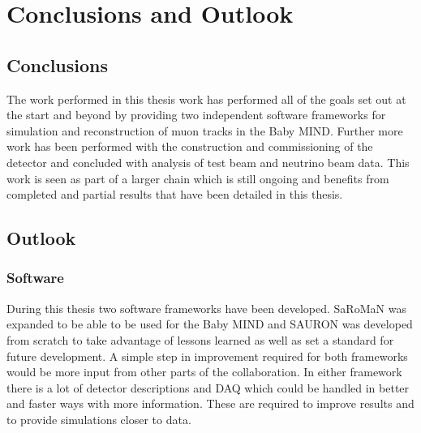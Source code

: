 \chapter{Conclusions and Outlook}
\label{c:conclusion}




\section{Conclusions}

The work performed in this thesis work has performed all of the goals set out at the start and beyond by providing two independent software frameworks for simulation and reconstruction of muon tracks in the Baby MIND. Further more work has been performed with the construction and commissioning of the detector and concluded with analysis of test beam and neutrino beam data. This work is seen as part of a larger chain which is still ongoing and benefits from completed and partial results that have been detailed in this thesis.

\pagebreak
\newpage
\section{Outlook}


\subsection{Software}

During this thesis two software frameworks have been developed. SaRoMaN was expanded to be able to be used for the Baby MIND and SAURON was developed from scratch to take advantage of lessons learned as well as set a standard for future development. A simple step in improvement required for both frameworks would be more input from other parts of the collaboration. In either framework there is a lot of detector descriptions and DAQ which could be handled in better and faster ways with more information. These are required to improve results and to provide simulations closer to data.

